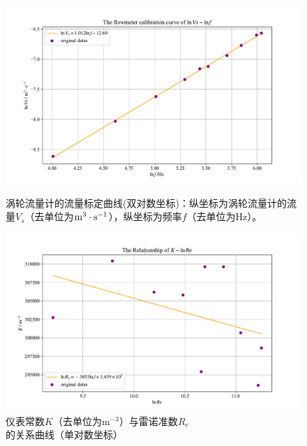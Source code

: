 \documentclass[UTF8,AutoFakeBold,a4paper]{article}
\begin{document}
\newpage
\begin{figure}[h]
	\centering
	\includegraphics[scale=0.5]{涡轮1}
	\caption{涡轮流量计的流量标定曲线(双对数坐标)：纵坐标为涡轮流量计的流量$V_{s}$（去单位为$\rm{m}^{3}\cdot\rm{s}^{-1}$），纵坐标为频率$f$（去单位为Hz）。}
	\label{fi3}
	
	\centering
	\includegraphics[scale=0.5]{涡轮2}
	\caption{仪表常数$K$（去单位为m$^{-3}$）与雷诺准数$R_{e}$的关系曲线（单对数坐标）}
	\label{fi4}
\end{figure}
\end{document}
